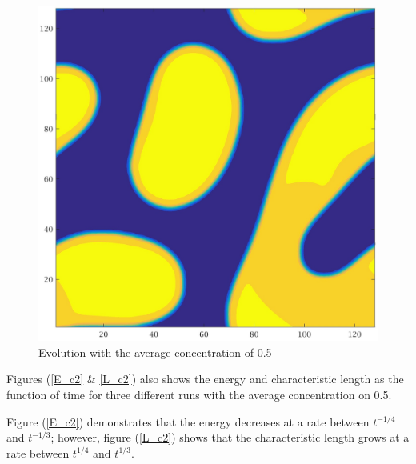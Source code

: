 \documentclass[a4paper,6pt]{article}
\begin{document}
\begin{figure}[H]
\begin{minipage}[b]{.32\linewidth}
        \end{minipage}
                \begin{minipage}[b]{.32\linewidth}
                \centering
                \includegraphics[width=1\textwidth]{pics/C2_t6.jpg}
        \end{minipage}
        \caption{Evolution with the average concentration of 0.5}
        \label{evolution_c2}
\end{figure}

Figures (\ref{E_c2} \& \ref{L_c2}) also shows the energy and characteristic length as the function of time for three different runs with the average concentration on 0.5.

Figure (\ref{E_c2}) demonstrates that the energy decreases at a rate between $t^{-1/4}$ and $t^{-1/3}$; however, figure (\ref{L_c2}) shows that the characteristic length grows at a rate between $t^{1/4}$ and $t^{1/3}$.
\end{document}
